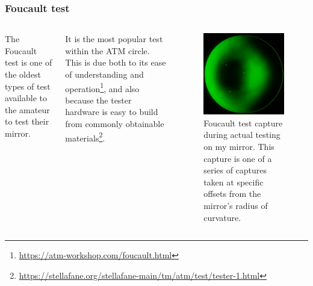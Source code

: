 \documentclass{beamer}
\begin{document}
\begin{frame}
\frametitle{Foucault test}
\begin{columns}
The Foucault test is one of the oldest types of test available to the amateur to test their mirror.

It is the most popular test within the ATM circle. This is due both to its ease of understanding and operation\footnote[frame]{\url{https://atm-workshop.com/foucault.html}}, and also because the tester hardware is easy to build from commonly obtainable materials\footnote[frame]{\url{https://stellafane.org/stellafane-main/tm/atm/test/tester-1.html}}.
\begin{figure}
\includegraphics[scale=0.3]{assets/Foucault.jpg}
\caption{Foucault test capture during actual testing on my mirror. This capture is one of a series of captures taken at specific offsets from the mirror's radius of curvature.}
\end{figure}
\end{columns}
\end{frame}
\end{document}
